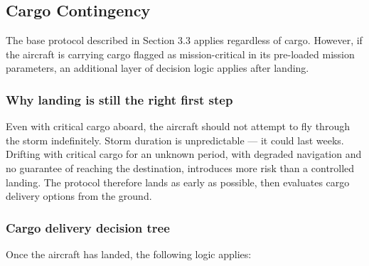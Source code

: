 \documentclass[a4paper,12pt]{article}
\begin{document}
\subsection{Cargo Contingency}
The base protocol described in Section 3.3 applies regardless of cargo. However, if the aircraft
is carrying cargo flagged as mission-critical in its pre-loaded mission parameters, an additional
layer of decision logic applies after landing.

\subsubsection*{Why landing is still the right first step}
Even with critical cargo aboard, the aircraft should not attempt to fly through the storm
indefinitely. Storm duration is unpredictable — it could last weeks. Drifting with critical
cargo for an unknown period, with degraded navigation and no guarantee of reaching the
destination, introduces more risk than a controlled landing. The protocol therefore lands
as early as possible, then evaluates cargo delivery options from the ground.

\subsubsection*{Cargo delivery decision tree}
Once the aircraft has landed, the following logic applies:
\end{document}
